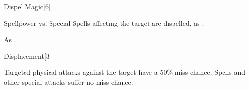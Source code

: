 \begin{spellsection}[Greater]{Dispel Magic}[6]
    \begin{spellheader}
    \end{spellheader}
    \begin{spellcontent}
        \begin{spelltargetinginfo}
        \end{spelltargetinginfo}
        \begin{spelleffects}
            \begin{spellattack}{Spellpower vs. Special}
                \spelleffect Spells affecting the target are dispelled, as .
            \end{spellattack}
        \end{spelleffects}
    \end{spellcontent}
    \begin{spellfooter}
        \spellnotes As .
        \miscastyou
    \end{spellfooter}
\end{spellsection}

\begin{spellsection}{Displacement}[3]
    \begin{spellheader}
    \end{spellheader}
    \begin{spellcontent}
        \begin{spelltargetinginfo}
        \end{spelltargetinginfo}
        \begin{spelleffects}
            \spelleffect Targeted physical attacks against the target have a 50\% miss chance. Spells and other special attacks suffer no miss chance.
            \spelldur \durshort \dismissable
        \end{spelleffects}
    \end{spellcontent}
    \begin{spellfooter}
        \miscastrandom
    \end{spellfooter}
\end{spellsection}

